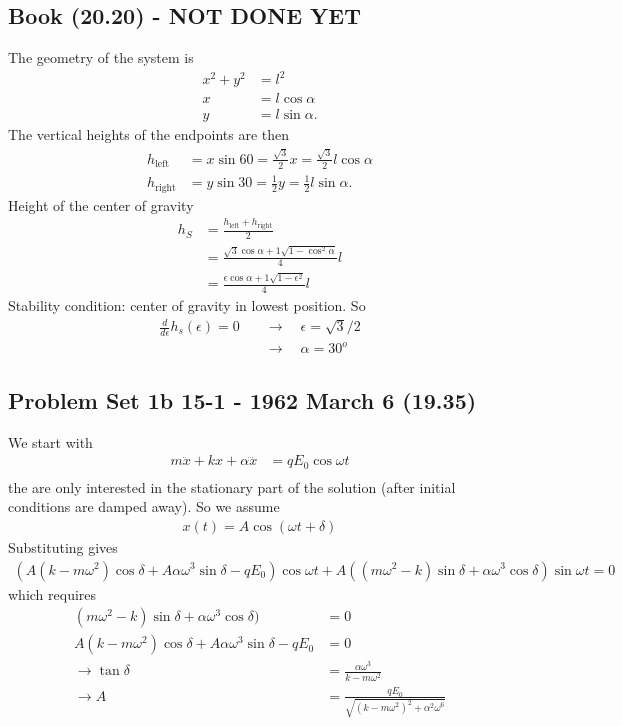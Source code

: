 \documentclass[../main.tex]{subfiles}
\begin{document}
\subsection{Book (20.20) - NOT DONE YET}
The geometry of the system is
\begin{align}
x^2+y^2&=l^2\\
x&=l\cos\alpha\\
y&=l\sin\alpha.
\end{align}
The vertical heights of the endpoints are then
\begin{align}
h_\text{left}
&=x\sin 60=\frac{\sqrt{3}}{2}x=\frac{\sqrt{3}}{2}l\cos\alpha\\
h_\text{right}&=y\sin 30=\frac{1}{2}y=\frac{1}{2}l\sin\alpha.
\end{align}
Height of the center of gravity
\begin{align}
h_S
&=\frac{h_\text{left}+h_\text{right}}{2}\\
&=\frac{\sqrt{3}\cos\alpha+1\sqrt{1-\cos^2\alpha}}{4}l\\
&=\frac{\epsilon\cos\alpha+1\sqrt{1-\epsilon^2}}{4}l
\end{align}
Stability condition: center of gravity in lowest position. So
\begin{align}
\frac{d}{d\epsilon}h_s(\epsilon)=0\quad&\rightarrow\quad\epsilon=\sqrt{3}/2\\
&\rightarrow\quad\alpha=30^o
\end{align}

\subsection{Problem Set 1b  15-1 - 1962 March 6 (19.35)}
We start with
\begin{align}
m\ddot{x}+kx+\alpha\dddot{x}&=qE_0\cos\omega t\\
\end{align}
the are only interested in the stationary part of the solution (after initial conditions are damped away). So we assume
\begin{align}
x(t)=A\cos(\omega t+\delta)
\end{align}
Substituting gives
\begin{align}
(A(k-m\omega^2)\cos\delta+A\alpha\omega^3\sin\delta-qE_0)\cos\omega t+A((m\omega^2-k)\sin\delta+\alpha\omega^3\cos\delta)\sin\omega t=0
\end{align}
which requires
\begin{align}
(m\omega^2-k)\sin\delta+\alpha\omega^3\cos\delta)&=0\\
A(k-m\omega^2)\cos\delta+A\alpha\omega^3\sin\delta-qE_0&=0\\
\rightarrow \tan\delta&=\frac{\alpha\omega^3}{k-m\omega^2}\\
\rightarrow A&=\frac{qE_0}{\sqrt{(k-m\omega^2)^2+\alpha^2\omega^6}}
\end{align}
\end{document}
